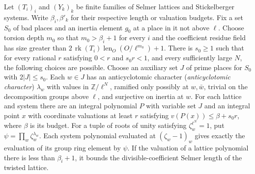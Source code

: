 \begin{lemma}
\label{lem:c-selmer-twist-polynomials}
\emitthmsource
Let $(T_i)_i$ and $(Y_k)_k$ be finite families of Selmer lattices and Stickelberger systems. Write $\beta_i,\beta'_k$ for their respective length or valuation budgets.
Fix a set $S_0$ of bad places and an inertia element $g_0$ at a place in it not above $\ell$.
Choose torsion depth $m_0$ so that $m_0>\beta_i+1$ for every $i$ and the coefficient residue field has size greater than $2\,\operatorname{rk}(T_i)\operatorname{len}_O(O/\ell^{m_0})+1$.
There is $s_0\ge1$ such that for every rational $r$ satisfying $0<r$ and $s_0r<1$, and every sufficiently large $N$, the following choices are possible.
Choose an auxiliary set $J$ of prime places for $S_0$ with $2|J|\le s_0$. Each $w\in J$ has an anticyclotomic character (\emph{anticyclotomic character}) $\lambda_w$ with values in $\mathbb Z/\ell^N$, ramified only possibly at $w,\bar w$, trivial on the decomposition groups above $\ell$, and surjective on inertia at $w$.
For each lattice and system there are an integral polynomial $P$ with variable set $J$ and an integral point $x$ with coordinate valuations at least $r$ satisfying $v(P(x))\le\beta+s_0r$, where $\beta$ is its budget.
For a tuple of roots of unity satisfying $\zeta_w^{\ell^N}=1$, put $\psi=\prod_w\zeta_w^{\lambda_w}$. Each system polynomial evaluated at $(\zeta_w-1)_w$ gives exactly the evaluation of its group ring element by $\psi$. If the valuation of a lattice polynomial there is less than $\beta_i+1$, it bounds the divisible-coefficient Selmer length of the twisted lattice.
\end{lemma}
